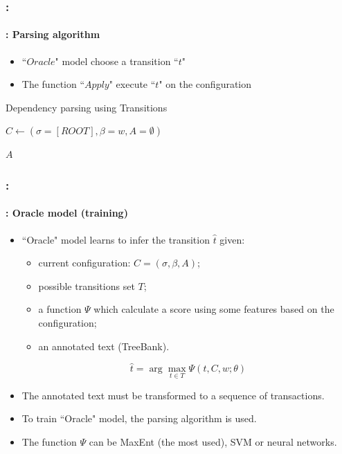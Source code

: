 \documentclass[xcolor=table]{beamer}
\begin{document}
\begin{frame}
	\frametitle{\insertshortsubtitle: \insertsection}
	\framesubtitle{\insertsubsection: Parsing algorithm}

	\begin{itemize}
		\item ``$Oracle$" model choose a transition ``$t$"
		\item The function ``$Apply$" execute ``$t$" on the configuration
	\end{itemize}
	
	\begin{block}{Dependency parsing using Transitions}
		\begin{algorithm}[H]
			
			$C \leftarrow (\sigma=[ROOT], \beta = w, A = \emptyset)$\;
			
			
		
			\Return $A$ \;
		\end{algorithm}
	\end{block}

\end{frame}

\begin{frame}
	\frametitle{\insertshortsubtitle: \insertsection}
	\framesubtitle{\insertsubsection: Oracle model (training)}

	\begin{itemize}
		\item ``Oracle" model learns to infer the transition $\hat{t}$ given:
		\begin{itemize}
			\item current configuration: $ C = (\sigma, \beta, A) $;
			\item possible transitions set $T$;
			\item a function $\Psi$ which calculate a score using some features based on the configuration;
			\item an annotated text (TreeBank).
		\end{itemize}
		\[ \hat{t} = \arg\max\limits_{t \in T} \Psi (t, C, w; \theta) \]
	
		\item The annotated text must be transformed to a sequence of transactions.
		\item To train ``Oracle" model, the parsing algorithm is used.
		\item The function $\Psi$  can be MaxEnt (the most used), SVM or neural networks.
	\end{itemize}

\end{frame}
\end{document}
